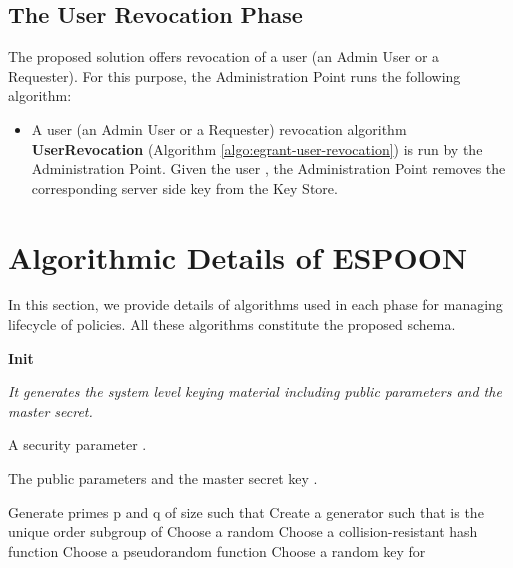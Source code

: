 \documentclass[epsfig,a4paper,11pt,titlepage]{book}
\numberwithin{algorithm}{chapter}
\newcommand{\algofontsize}{\fontsize{11}{12}\selectfont}
\begin{document}
\subsection{The User Revocation Phase}
The proposed solution offers revocation of a user (an Admin User or a Requester). For this purpose, the Administration Point runs the following algorithm:

\begin{itemize}

\item A user (an Admin User or a Requester) revocation algorithm \textbf{UserRevocation} (Algorithm \ref{algo:egrant-user-revocation}) is run by the Administration Point. Given the user , the Administration Point removes the corresponding server side key  from the Key Store.

\end{itemize}

\section[Algorithmic Details of ESPOON]{Algorithmic Details of \gls{ESPOON}}
\label{sec:espoon-algorithmic-details}
In this section, we provide details of algorithms used in each phase for managing lifecycle of policies. All these algorithms constitute the proposed schema. 



\begin{algorithm} [htp]
{\algofontsize
\caption{\textbf{Init}}

\label{algo:erbac-init}

\begin{algorithmic}[1]

\INPUT \emph{It generates the system level keying material including public parameters and the master secret.}

\Require A security parameter .

\Ensure The public parameters  and the master secret key .

\medskip

\State Generate primes p and q of size  such that    \label{line:erbac-primes}
\State Create a generator  such that  is the unique order  subgroup of  \label{line:erbac-generator}
\State Choose a random  \label{line:erbac-master-x}
\State  \label{line:erbac-params-h}
\State Choose a collision-resistant hash function  \label{line:erbac-params-H}
\State Choose a pseudorandom function  \label{line:erbac-params-f}
\State Choose a random key  for  \label{line:erbac-master-s}
\State  \label{line:erbac-params}
\State  \label{line:erbac-master}

\Return 

\end{algorithmic}
}
\end{algorithm}
\end{document}

